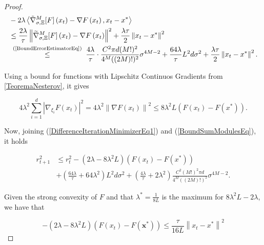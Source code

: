 \begin{proof}
\begin{equation}
 \begin{aligned} 
 & -2 \lambda\left\langle\tilde{\nabla}_{\sigma, \Xi}^{M}[F]\left(x_{t}\right)-\nabla F\left(x_{t}\right), x_{t}-x^{*}\right\rangle \\ 
 & \leq \frac{2 \lambda}{\tau}\left\lVert\widetilde{\nabla}_{\sigma, \Xi}^{M}[F]\left(x_{t}\right)-\nabla F\left(x_{t}\right)\right\rVert^{2}+\frac{\lambda \tau}{2}\left\lVert x_{t}-x^{*}\right\rVert^{2} \\ 
 & \stackrel{\text { (\ref{BoundErrorEstimatorEq}) }}{\leq} \frac{4 \lambda}{\tau} \cdot \frac{C^{2} \pi d(M !)^{2}}{4^{M}((2 M) !)^{2}} \sigma^{4 M-2}+\frac{64 \lambda}{\tau} L^{2} d \sigma^{2}+\frac{\lambda \tau}{2}\left\lVert x_{t}-x^{*}\right\rVert^{2}.
 \end{aligned} 
\end{equation}

Using a bound for functions with Lipschitz Continuos Gradients from \ref{TeoremaNesterov}, it gives

\begin{equation}\label{BoundSumModulesEq}
 4 \lambda^{2} \sum_{i=1}^{d}\left|\nabla_{\xi_{i}} F\left(x_{t}\right)\right|^{2}=4 \lambda^{2}\left\|\nabla F\left(x_{t}\right)\right\|^{2} \leq 8 \lambda^{2} L\left(F\left(x_{t}\right)-F\left(x^{*}\right)\right) . 
\end{equation}

Now, joining (\ref{DifferenceIterationMinimizerEq1}) and (\ref{BoundSumModulesEq}), it holds

\begin{equation}\label{FirstRecursiveIneq}
 \begin{aligned} 
 r_{t+1}^{2} 
 & \leq r_{t}^{2}-\left(2 \lambda-8 \lambda^{2} L\right)\left(F\left(x_{t}\right)-F\left(x^{*}\right)\right) \\ 
 & +\left(\frac{64 \lambda}{\tau}+64 \lambda^{2}\right) L^{2} d \sigma^{2}+\left(\frac{4 \lambda}{\tau}+2 \lambda^{2}\right) \frac{C^{2}(M !)^{2} \pi d}{4^{M}((2 M) !)^{2}} \sigma^{4 M-2}. 
 \end{aligned} 
\end{equation}

Given the strong convexity of $F$ and that $\lambda^*=\frac{1}{8L}$ is the maximum for $8\lambda^2 L - 2 \lambda$, we have that

\begin{equation}\label{BoundFromStrongConvexity}
	-\left(2 \lambda-8 \lambda^{2} L\right)\left(F\left(x_{t}\right)-F\left(\boldsymbol{x}^{*}\right)\right) \leq \frac{\tau}{16 L}\left\|x_{t}-x^{*}\right\|^{2} 
\end{equation}


\end{proof}
